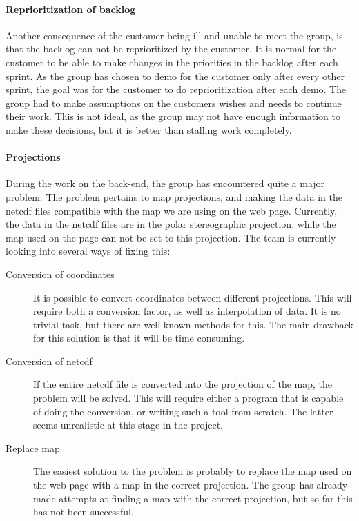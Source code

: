 \documentclass[11pt,a4paper,titlepage,oneside]{report}
\begin{document}
\paragraph{Reprioritization of backlog}
Another consequence of the customer being ill and unable to meet the group, is that the backlog can not be reprioritized by the customer. It is normal for the customer to be able to make changes in the priorities in the backlog after each sprint. As the group has chosen to demo for the customer only after every other sprint, the goal was for the customer to do reprioritization after each demo. The group had to make assumptions on the customers wishes and needs to continue their work. This is not ideal, as the group may not have enough information to make these decisions, but it is better than stalling work completely. 

\paragraph{Projections}
During the work on the \gls{back-end}, the group has encountered quite a major problem. The problem pertains to map projections, and making the data in the \gls{netcdf} files compatible with the map we are using on the web page. Currently, the data in the \gls{netcdf} files are in the polar stereographic projection, while the map used on the page can not be set to this projection. The team is currently looking into several ways of fixing this:

\begin{description}
\item[Conversion of coordinates] It is possible to convert coordinates between different projections. This will require both a conversion factor, as well as interpolation of data. It is no trivial task, but there are well known methods for this. The main drawback for this solution is that it will be time consuming. 
\item[Conversion of \gls{netcdf}] If the entire \gls{netcdf} file is converted into the projection of the map, the problem will be solved. This will require either a program that is capable of doing the conversion, or writing such a tool from scratch. The latter seems unrealistic at this stage in the project.
\item[Replace map] The easiest solution to the problem is probably to replace the map used on the web page with a map in the correct projection. The group has already made attempts at finding a map with the correct projection, but so far this has not been successful.
\end{description}
\end{document}
